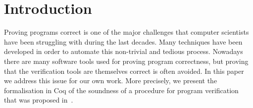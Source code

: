 \documentclass[conference]{IEEEtran}
\newcommand{\RL}{\textsc{rl}\xspace}
\begin{document}
%






\maketitle

\begin{abstract}
Proving programs correct is one of the major challenges that computer scientists have been struggling with during the last decades.
For this purpose, Reachability Logic (\RL) was proposed as a language-parametric generalisation of Hoare Logic. 
Recently, based on \RL, an automatic verification procedure was given and proved sound. 
In this paper we generalise this procedure and prove its soundness formally in the Coq proof assistant. 
For the formalisation we had to deal with all the minutiae that were neglected in the paper proof. 
The trickiest one was appropriate renaming of free variables which, we discovered, was handled in the paper proof using an insufficient assumption.
We also discovered a missing case in the paper proof, and we clarified some implicit and hidden hypotheses.
Last but not least, the Coq formalisation provides us with a certified program-verification procedure.
\end{abstract}


\section{Introduction}
Proving programs correct is one of the major challenges that computer scientists have been struggling with during the last decades.
Many techniques have been developed  in order to automate this non-trivial and tedious process.
Nowadays there are many software tools used for proving program correctness, but proving that the verification tools are themselves correct  is often avoided.
In this paper we address this issue for our own work.
More precisely, we present the formalisation in Coq of the soundness of a procedure for program verification that was  proposed in~\cite{lucanu-rusu-arusoaie-nowak-LRC2015}.
\end{document}
